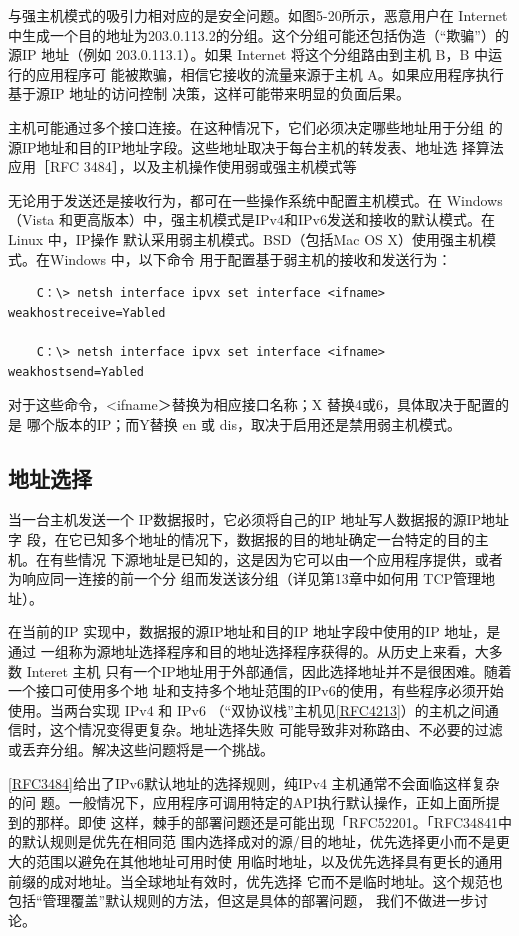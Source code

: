 与强主机模式的吸引力相对应的是安全问题。如图5-20所示，恶意用户在 Internet
中生成一个目的地址为203.0.113.2的分组。这个分组可能还包括伪造（“欺骗”）的源IP
地址（例如 203.0.113.1）。如果 Internet 将这个分组路由到主机 B，B 中运行的应用程序可
能被欺骗，相信它接收的流量来源于主机 A。如果应用程序执行基于源IP 地址的访问控制
决策，这样可能带来明显的负面后果。

主机可能通过多个接口连接。在这种情况下，它们必须决定哪些地址用于分组
的源IP地址和目的IP地址字段。这些地址取决于每台主机的转发表、地址选
择算法应用［RFC 3484］，以及主机操作使用弱或强主机模式等

无论用于发送还是接收行为，都可在一些操作系统中配置主机模式。在 Windows （Vista
和更高版本）中，强主机模式是IPv4和IPv6发送和接收的默认模式。在 Linux 中，IP操作
默认采用弱主机模式。BSD（包括Mac OS X）使用强主机模式。在Windows 中，以下命令
用于配置基于弱主机的接收和发送行为：

\begin{verbatim}
    C：\> netsh interface ipvx set interface <ifname> weakhostreceive=Yabled

    C：\> netsh interface ipvx set interface <ifname> weakhostsend=Yabled
\end{verbatim}

对于这些命令，<ifname＞替换为相应接口名称；X 替换4或6，具体取决于配置的是
哪个版本的IP；而Y替换 en 或 dis，取决于启用还是禁用弱主机模式。

\subsection{地址选择}

当一台主机发送一个 IP数据报时，它必须将自己的IP 地址写人数据报的源IP地址字
段，在它已知多个地址的情况下，数据报的目的地址确定一台特定的目的主机。在有些情况
下源地址是已知的，这是因为它可以由一个应用程序提供，或者为响应同一连接的前一个分
组而发送该分组（详见第13章中如何用 TCP管理地址）。

在当前的IP 实现中，数据报的源IP地址和目的IP 地址字段中使用的IP 地址，是通过
一组称为源地址选择程序和目的地址选择程序获得的。从历史上来看，大多数 Interet 主机
只有一个IP地址用于外部通信，因此选择地址并不是很困难。随着一个接口可使用多个地
址和支持多个地址范围的IPv6的使用，有些程序必须开始使用。当两台实现 IPv4 和 IPv6
（“双协议栈”主机见\href{https://www.rfc-editor.org/rfc/rfc4213}{[RFC4213]}）的主机之间通信时，这个情况变得更复杂。地址选择失败
可能导致非对称路由、不必要的过滤或丢弃分组。解决这些问题将是一个挑战。

\href{https://www.rfc-editor.org/rfc/rfc3484}{[RFC3484]}给出了IPv6默认地址的选择规则，纯IPv4
主机通常不会面临这样复杂的问
题。一般情况下，应用程序可调用特定的API执行默认操作，正如上面所提到的那样。即使
这样，棘手的部署问题还是可能出现「RFC52201。「RFC34841中的默认规则是优先在相同范
围内选择成对的源/目的地址，优先选择更小而不是更大的范围以避免在其他地址可用时使
用临时地址，以及优先选择具有更长的通用前缀的成对地址。当全球地址有效时，优先选择
它而不是临时地址。这个规范也包括“管理覆盖”默认规则的方法，但这是具体的部署问题，
我们不做进一步讨论。

